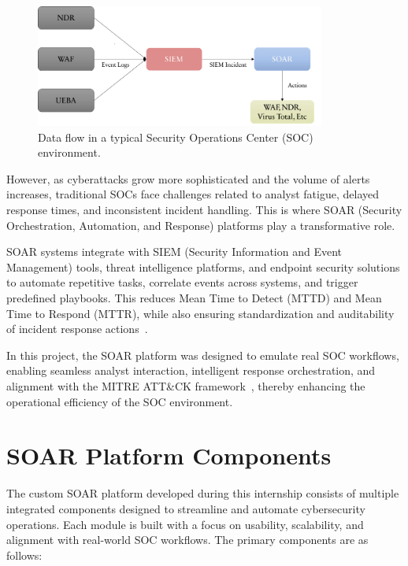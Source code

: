 \begin{figure}[htbp]
    \centering
    \includegraphics[width=0.85\textwidth]{images/data_flow_soc.png}
    \caption{Data flow in a typical Security Operations Center (SOC) environment.}
    \label{fig:data_flow_soc}
\end{figure}

However, as cyberattacks grow more sophisticated and the volume of alerts increases, traditional SOCs face challenges related to analyst fatigue, delayed response times, and inconsistent incident handling. This is where SOAR (Security Orchestration, Automation, and Response) platforms play a transformative role.

SOAR systems integrate with SIEM (Security Information and Event Management) tools, threat intelligence platforms, and endpoint security solutions to automate repetitive tasks, correlate events across systems, and trigger predefined playbooks. This reduces Mean Time to Detect (MTTD) and Mean Time to Respond (MTTR), while also ensuring standardization and auditability of incident response actions~\cite{paloalto_soar}.

In this project, the SOAR platform was designed to emulate real SOC workflows, enabling seamless analyst interaction, intelligent response orchestration, and alignment with the MITRE ATT\&CK framework~\cite{mitre_attack}, thereby enhancing the operational efficiency of the SOC environment.

\section*{SOAR Platform Components}

The custom SOAR platform developed during this internship consists of multiple integrated components designed to streamline and automate cybersecurity operations. Each module is built with a focus on usability, scalability, and alignment with real-world SOC workflows. The primary components are as follows:

